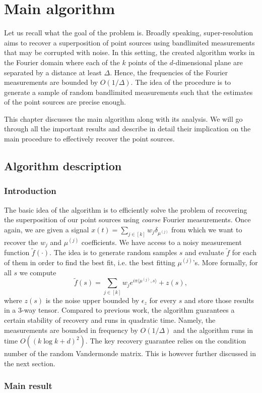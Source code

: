 \chapter{Main algorithm}
Let us recall what the goal of the problem is. Broadly speaking, super-resolution aims to recover a superposition of point sources using bandlimited measurements that may be corrupted with noise. In this setting, the created algorithm works in the Fourier domain where each of the $k$ points of the $d$-dimensional plane are separated by a distance at least $\Delta$. Hence, the frequencies of the Fourier measurements are bounded by $O(1/\Delta)$. The idea of the procedure is to generate a sample of random bandlimited measurements such that the estimates of the point sources are precise enough.\par 
This chapter discusses the main algorithm along with its analysis. We will go through all the important results and describe in detail their implication on the main procedure to effectively recover the point sources.

\section{Algorithm description}
\subsection{Introduction}
The basic idea of the algorithm is to efficiently solve the problem of recovering the superposition of our point sources using \textit{coarse} Fourier measurements. Once again, we are given a signal $x(t)=\sum_{j\in[k]}w_j\delta_{\mu^{(j)}}$ from which we want to recover the $w_j$ and $\mu^{(j)}$ coefficients. We have access to a noisy measurement function $\tilde{f}(\cdot)$. The idea is to generate random samples $s$ and evaluate $\tilde{f}$ for each of them in order to find the best fit, i.e. the best fitting $\mu^{(j)}$'s. More formally, for all $s$ we compute $$\tilde{f}(s)=\sum_{j\in[k]}w_je^{i\pi\langle\mu^{(j)},s\rangle}+z(s),$$ where $z(s)$ is the noise upper bounded by $\epsilon_z$ for every $s$ and store those results in a 3-way tensor. Compared to previous work, the algorithm guarantees a certain stability of recovery and runs in quadratic time. Namely, the measurements are bounded in frequency by $O(1/\Delta)$ and the algorithm runs in time $O((k\log k+d)^2)$. The key recovery guarantee relies on the condition number of the random Vandermonde matrix. This is however further discussed in the next section.
\subsection{Main result}
